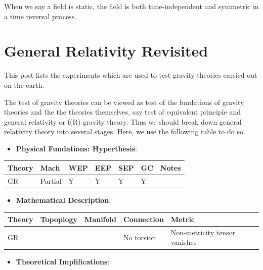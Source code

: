 \documentclass[letterpaper,10pt,english]{sphinxmanual}
\begin{document}
{When we say a field is static, the field is both time-independent and symmetric in a time reversal process.


\section{General Relativity Revisited}
\label{GeneralRelativityAdv:general-relativity-revisited}\label{GeneralRelativityAdv::doc}
This post lists the experiments which are used to test gravity theories
carried out on the earth.

The test of gravity theories can be viewed as test of the fundations of
gravity theories and the the theories themselves, say test of equivalent
principle and general relativity or f(R) gravity theory. Thus we should
break down general relativity theory into several stages. Here, we use
the following table to do so.
\begin{itemize}
\item {} 
\textbf{Physical Fundations: Hyperthesis}:

\end{itemize}

\begin{tabulary}{\linewidth}{|L|L|L|L|L|L|L|}
\hline
\textsf{\relax 
Theory
} & \textsf{\relax 
Mach
} & \textsf{\relax 
WEP
} & \textsf{\relax 
EEP
} & \textsf{\relax 
SEP
} & \textsf{\relax 
GC
} & \textsf{\relax 
Notes
}\\
\hline
GR
 & 
Partial
 & 
Y
 & 
Y
 & 
Y
 & 
Y
 & \\
\hline\end{tabulary}

\begin{itemize}
\item {} 
\textbf{Mathematical Description}:

\end{itemize}

\begin{tabulary}{\linewidth}{|L|L|L|L|L|}
\hline
\textsf{\relax 
Theory
} & \textsf{\relax 
Topoplogy
} & \textsf{\relax 
Manifold
} & \textsf{\relax 
Connection
} & \textsf{\relax 
Metric
}\\
\hline
GR
 &  &  & 
No torsion
 & 
Non-metricity tensor vanishes
\\
\hline\end{tabulary}

\begin{itemize}
\item {} 
\textbf{Theoretical Implifications}:


\end{itemize}}
\end{document}

